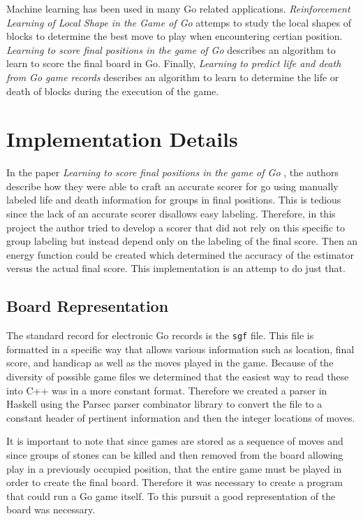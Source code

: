\documentclass[11pt,letterpaper]{article}
\begin{document}
Machine learning has been used in many Go related applications.
\emph{Reinforcement Learning of Local Shape in the Game of Go} \cite{SSM:07}  attemps to study the local shapes
of blocks to determine the best move to play when encountering certian position.
\emph{Learning to score final positions in the game of Go} \cite{WHU:04} describes an algorithm to learn to score
the final board in Go. Finally, \emph{Learning to predict life and death from Go game records} \cite{WWHU:05}
describes an algorithm to learn to determine the life or death of blocks during the execution of the game.

\section{Implementation Details}

In the paper \emph{Learning to score final positions in the game of Go} \cite{WHU:04}, the authors describe how they
were able to craft an accurate scorer for go using manually labeled life and death information for groups in final
positions. This is tedious since the lack of an accurate scorer disallows easy labeling. Therefore, in this project the
author tried to develop a scorer that did not rely on this specific to group labeling but instead depend only on the
labeling of the final score. Then an energy function could be created which determined the accuracy of the estimator
versus the actual final score. This implementation is an attemp to do just that.

\subsection{Board Representation}

The standard record for electronic Go records is the {\tt sgf} file. This file is formatted in a specific way that allows
various information such as location, final score, and handicap as well as the moves played in the game. Because
of the diversity of possible game files we determined that the easiest way to read these into C++ was in a more
constant format. Therefore we created a parser in Haskell using the Parsec parser combinator library to convert the
file to a constant header of pertinent information and then the integer locations of moves.

It is important to note that since games are stored as a sequence of moves and since groups of stones can be
killed and then removed from the board allowing play in a previously occupied position, that the entire game must be
played in order to create the final board. Therefore it was necessary to create a program that could run a Go game
itself. To this pursuit a good representation of the board was necessary.
\end{document}
